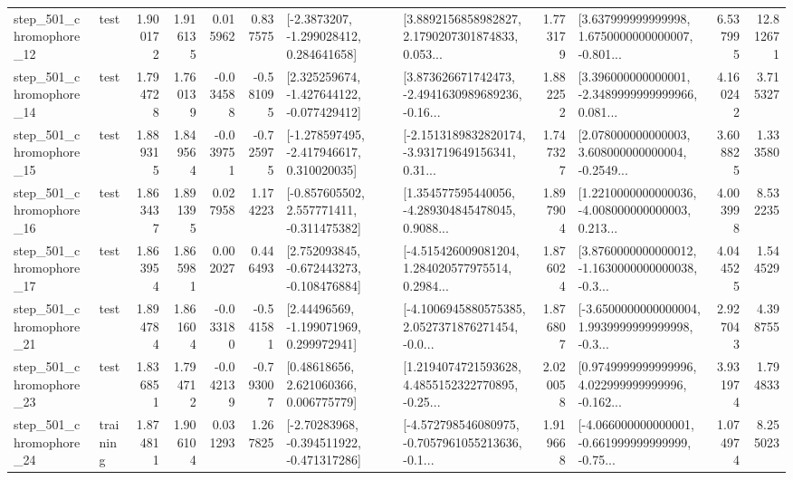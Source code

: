\begin{tabular}{llrrrrllrlrr}
  step\_501\_chromophore\_12 &      test &      1.900172 &    1.916135 &      0.015962 &  0.837575 &     [-2.3873207, -1.299028412, 0.284641658] &  [3.8892156858982827, 2.1790207301874833, 0.053... &       1.773179 &  [3.637999999999998, 1.6750000000000007, -0.801... &            6.537995 &         12.812671 \\
  step\_501\_chromophore\_14 &      test &      1.794728 &    1.760139 &     -0.034588 & -0.581095 &   [2.325259674, -1.427644122, -0.077429412] &  [3.873626671742473, -2.4941630989689236, -0.16... &       1.882252 &  [3.396000000000001, -2.3489999999999966, 0.081... &            4.160242 &          3.715327 \\
  step\_501\_chromophore\_15 &      test &      1.889315 &    1.849564 &     -0.039751 & -0.725975 &   [-1.278597495, -2.417946617, 0.310020035] &  [-2.1513189832820174, -3.931719649156341, 0.31... &       1.747327 &  [2.078000000000003, 3.608000000000004, -0.2549... &            3.608825 &          1.333580 \\
  step\_501\_chromophore\_16 &      test &      1.863437 &    1.891395 &      0.027958 &  1.174223 &   [-0.857605502, 2.557771411, -0.311475382] &  [1.354577595440056, -4.289304845478045, 0.9088... &       1.897904 &  [1.2210000000000036, -4.008000000000003, 0.213... &            4.003998 &          8.532235 \\
  step\_501\_chromophore\_17 &      test &      1.863954 &    1.865981 &      0.002027 &  0.446493 &   [2.752093845, -0.672443273, -0.108476884] &  [-4.515426009081204, 1.284020577975514, 0.2984... &       1.876024 &  [3.8760000000000012, -1.1630000000000038, -0.3... &            4.044525 &          1.544529 \\
  step\_501\_chromophore\_21 &      test &      1.894784 &    1.861604 &     -0.033180 & -0.541581 &     [2.44496569, -1.199071969, 0.299972941] &  [-4.1006945880575385, 2.0527371876271454, -0.0... &       1.876807 &  [-3.6500000000000004, 1.9939999999999998, -0.3... &            2.927043 &          4.398755 \\
  step\_501\_chromophore\_23 &      test &      1.836851 &    1.794712 &     -0.042139 & -0.793007 &      [0.48618656, 2.621060366, 0.006775779] &  [1.2194074721593628, 4.4855152322770895, -0.25... &       2.020058 &  [0.9749999999999996, 4.022999999999996, -0.162... &            3.931974 &          1.794833 \\
  step\_501\_chromophore\_24 &  training &      1.874811 &    1.906104 &      0.031293 &  1.267825 &   [-2.70283968, -0.394511922, -0.471317286] &  [-4.572798546080975, -0.7057961055213636, -0.1... &       1.919668 &  [-4.066000000000001, -0.661999999999999, -0.75... &            1.074974 &          8.255023 \\

\end{tabular}
